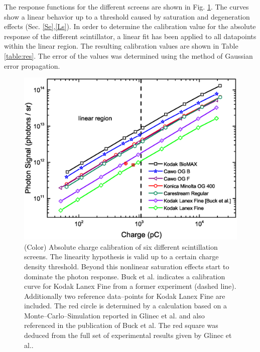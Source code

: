 \documentclass[%
reprint,
amsmath,
amssymb,
aip,
rsi, 
numerical,
floatfix,
]{revtex4-1}
\begin{document}


The response functions for the different screens are shown in Fig. \ref{fig:Calib}.
The curves show a linear behavior up to a threshold caused by saturation and degeneration effects (Sec. \ref{Se},\ref{Ls}).  
In order to determine the calibration value for the absolute response of the different scintillator, a linear fit has been applied to all datapoints within the linear region.
The resulting calibration values are shown in Table \ref{table:res}. 
The error of the values was determined using the method of Gaussian error propagation.
   
\begin{figure}
\includegraphics[width=\textwidth]{./Figures/Absolute}%
\caption{\label{fig:Calib}(Color) Absolute charge calibration of six different scintillation screens.
The linearity hypothesis is valid up to a certain charge density threshold. Beyond this nonlinear saturation effects start to dominate the photon response.
Buck et al. indicates a calibration curve for Kodak Lanex Fine from a former experiment \cite{Buck2010} (dashed line).
Additionally two reference data--points for Kodak Lanex Fine are included. 
The red circle is determined by a calculation based on a Monte--Carlo--Simulation reported in Glinec et al. \cite{Glinec2006} and also referenced in the publication of Buck et al. 
The red square was deduced from the full set of experimental results given by Glinec et al.. }
\end{figure}
\end{document}
